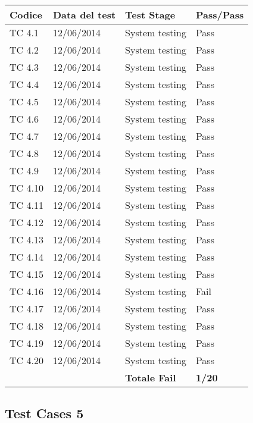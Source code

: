 \begin{tabular}{|p{3cm}|p{3cm}|p{3cm}|p{3cm}|}
	\hline
	\rowcolor{Gray}
	\textbf{Codice} & \textbf{Data del test} & \textbf{Test Stage} & \textbf{Pass/Pass}\tabularnewline
	\hline
	TC 4.1			& 12/06/2014 			& System testing		& Pass \tabularnewline
	\hline
	TC 4.2			& 12/06/2014 			& System testing		& Pass \tabularnewline
	\hline
	TC 4.3			& 12/06/2014 			& System testing		& Pass \tabularnewline
	\hline
	TC 4.4			& 12/06/2014 			& System testing		& Pass \tabularnewline
	\hline
	TC 4.5			& 12/06/2014 			& System testing		& Pass \tabularnewline
	\hline
	TC 4.6			& 12/06/2014 			& System testing		& Pass \tabularnewline
	\hline
	TC 4.7			& 12/06/2014 			& System testing		& Pass \tabularnewline
	\hline
	TC 4.8			& 12/06/2014 			& System testing		& Pass \tabularnewline
	\hline
	TC 4.9			& 12/06/2014 			& System testing		& Pass \tabularnewline
	\hline
	TC 4.10			& 12/06/2014 			& System testing		& Pass \tabularnewline
	\hline
	TC 4.11			& 12/06/2014 			& System testing		& Pass \tabularnewline
	\hline
	TC 4.12			& 12/06/2014 			& System testing		& Pass \tabularnewline
	\hline
	TC 4.13			& 12/06/2014 			& System testing		& Pass \tabularnewline
	\hline
	TC 4.14			& 12/06/2014 			& System testing		& Pass \tabularnewline
	\hline
	TC 4.15			& 12/06/2014 			& System testing		& Pass \tabularnewline
	\hline
	TC 4.16			& 12/06/2014 			& System testing		& Fail \tabularnewline
	\hline
	TC 4.17			& 12/06/2014 			& System testing		& Pass \tabularnewline
	\hline
	TC 4.18			& 12/06/2014 			& System testing		& Pass \tabularnewline
	\hline
	TC 4.19			& 12/06/2014 			& System testing		& Pass \tabularnewline
	\hline
	TC 4.20			& 12/06/2014 			& System testing		& Pass \tabularnewline
	\hline
					& 						& \textbf{Totale Fail}	& \textbf{1/20} \tabularnewline
	\hline
\end{tabular}

\subsection{Test Cases 5}

